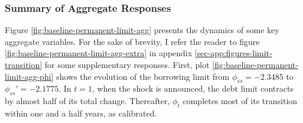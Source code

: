 \documentclass[a4paper,12pt]{article} %
\numberwithin{equation}{section} %
\numberwithin{figure}{section}
\numberwithin{table}{section}
\begin{document}
\subsubsection{Summary of Aggregate Responses}
\label{sec:limit-transition-summ}

Figure \ref{fig:baseline-permanent-limit-agg} presents the dynamics of some key aggregate variables. For the sake of brevity, I refer the reader to figure \ref{fig:baseline-permanent-limit-agg-extra} in appendix \ref{sec-app:figures-limit-transition} for some supplementary responses. First, plot \ref{fig:baseline-permanent-limit-agg-phi} shows the evolution of the borrowing limit from $\phi_{ss} = -2.3485$ to $\phi_{ss}' = -2.1775$. In $t=1$, when the shock is announced, the debt limit contracts by almost half of its total change. Thereafter, $\phi_t$ completes most of its transition within one and a half years, as calibrated.
\end{document}
